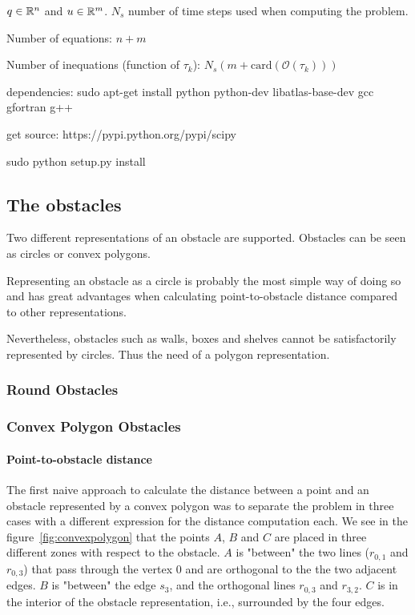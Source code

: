 $q \in \mathbb{R}^n$ and $u \in \mathbb{R}^m$. $N_s$ number of time steps used when computing the problem.

Number of equations: $n + m$

Number of inequations (function of $\tau_k$): $N_s(m+\mathrm{card}(\mathcal{O}(\tau_k)))$

dependencies:
sudo apt-get install python python-dev libatlas-base-dev gcc gfortran g++

get source:
https://pypi.python.org/pypi/scipy

sudo python setup.py install

\subsection{The obstacles}


Two different representations of an obstacle are supported. Obstacles can be seen as circles or convex polygons.

Representing an obstacle as a circle is probably the most simple way of doing so and has great advantages when
calculating point-to-obstacle distance compared to other representations.

Nevertheless, obstacles such as walls, boxes and shelves cannot be satisfactorily represented by circles.
Thus the need of a polygon representation.

\subsubsection{Round Obstacles}



\subsubsection{Convex Polygon Obstacles}

\paragraph{Point-to-obstacle distance}

The first naive approach to calculate the distance between a point and an obstacle represented by a convex polygon
was to separate the problem in three cases with a different expression for the distance computation each.
We see in the figure~\ref{fig:convexpolygon} that the points $A$, $B$ and $C$ are placed in three different
zones with respect to the obstacle. $A$ is "between" the two lines ($r_{0,1}$ and $r_{0,3}$) that pass through
the vertex $0$ and are orthogonal to the the two adjacent edges. $B$ is "between" the edge $s_{3}$, and the
orthogonal lines $r_{0,3}$ and $r_{3,2}$. $C$ is in the interior of the obstacle representation, i.e., surrounded by the four edges.

